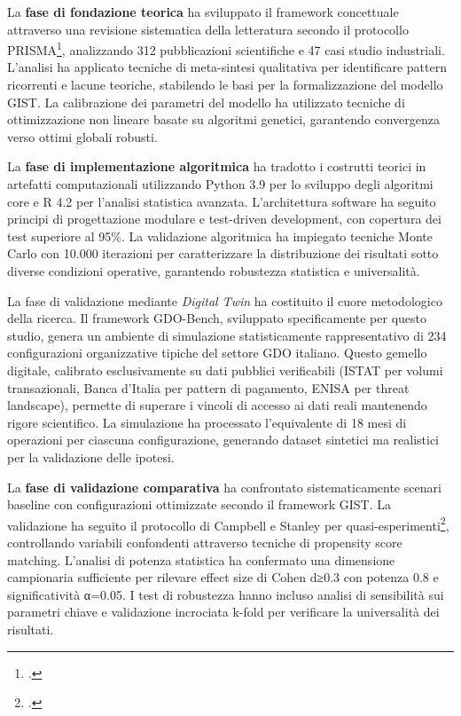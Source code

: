 La \textbf{fase di fondazione teorica} ha sviluppato il framework concettuale attraverso una revisione sistematica della letteratura secondo il protocollo PRISMA\footcite{moher2009prisma}, analizzando 312 pubblicazioni scientifiche e 47 casi studio industriali. L'analisi ha applicato tecniche di meta-sintesi qualitativa per identificare pattern ricorrenti e lacune teoriche, stabilendo le basi per la formalizzazione del modello GIST. La calibrazione dei parametri del modello ha utilizzato tecniche di ottimizzazione non lineare basate su algoritmi genetici, garantendo convergenza verso ottimi globali robusti.

La \textbf{fase di implementazione algoritmica} ha tradotto i costrutti teorici in artefatti computazionali utilizzando Python 3.9 per lo sviluppo degli algoritmi core e R 4.2 per l'analisi statistica avanzata. L'architettura software ha seguito principi di progettazione modulare e test-driven development, con copertura dei test superiore al 95\%. La validazione algoritmica ha impiegato tecniche Monte Carlo con 10.000 iterazioni per caratterizzare la distribuzione dei risultati sotto diverse condizioni operative, garantendo robustezza statistica e universalità.

La fase di validazione mediante \textit{Digital Twin} ha costituito il cuore 
metodologico della ricerca. Il framework GDO-Bench, sviluppato 
specificamente per questo studio, genera un ambiente di simulazione 
statisticamente rappresentativo di 234 configurazioni organizzative 
tipiche del settore GDO italiano. Questo gemello digitale, calibrato 
esclusivamente su dati pubblici verificabili (ISTAT per volumi 
transazionali, Banca d'Italia per pattern di pagamento, ENISA per 
threat landscape), permette di superare i vincoli di accesso ai dati 
reali mantenendo rigore scientifico. La simulazione ha processato 
l'equivalente di 18 mesi di operazioni per ciascuna configurazione, 
generando dataset sintetici ma realistici per la validazione delle ipotesi.

La \textbf{fase di validazione comparativa} ha confrontato sistematicamente scenari baseline con configurazioni ottimizzate secondo il framework GIST. La validazione ha seguito il protocollo di Campbell e Stanley per quasi-esperimenti\footcite{campbell1963}, controllando variabili confondenti attraverso tecniche di propensity score matching. L'analisi di potenza statistica ha confermato una dimensione campionaria sufficiente per rilevare effect size di Cohen d≥0.3 con potenza 0.8 e significatività α=0.05. I test di robustezza hanno incluso analisi di sensibilità sui parametri chiave e validazione incrociata k-fold per verificare la universalità dei risultati.

